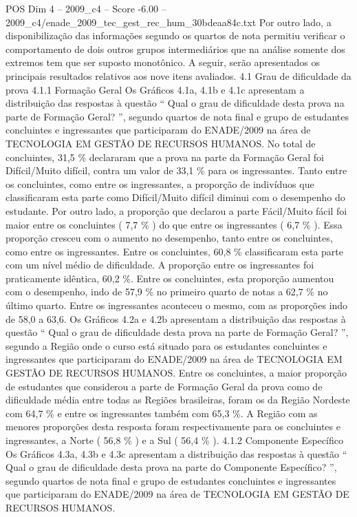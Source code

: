 \begin{textsample}{POS Dim 4 – 2009\_c4 – Score -6.00 – 2009\_c4/enade\_2009\_tec\_gest\_rec\_hum\_30bdeaa84c.txt}
Por outro lado, a disponibilização das informações segundo os quartos de nota permitiu verificar o comportamento de dois outros grupos intermediários que na análise somente dos extremos tem que ser suposto monotônico.
A seguir, serão apresentados os principais resultados relativos aos nove itens avaliados. 4.1 Grau de dificuldade da prova 4.1.1 Formação Geral Os Gráficos 4.1a, 4.1b e 4.1c apresentam a distribuição das respostas à questão “ Qual o grau de dificuldade desta prova na parte de Formação Geral? ”, segundo quartos de nota final e grupo de estudantes concluintes e ingressantes que participaram do ENADE/2009 na área de TECNOLOGIA EM GESTÃO DE RECURSOS HUMANOS.
No total de concluintes, 31,5 \% declararam que a prova na parte da Formação Geral foi Difícil/Muito difícil, contra um valor de 33,1 \% para os ingressantes.
Tanto entre os concluintes, como entre os ingressantes, a proporção de indivíduos que classificaram esta parte como Difícil/Muito difícil diminui com o desempenho do estudante.
Por outro lado, a proporção que declarou a parte Fácil/Muito fácil foi maior entre os concluintes ( 7,7 \% ) do que entre os ingressantes ( 6,7 \% ).
Essa proporção cresceu com o aumento no desempenho, tanto entre os concluintes, como entre os ingressantes.
Entre os concluintes, 60,8 \% classificaram esta parte com um nível médio de dificuldade.
A proporção entre os ingressantes foi praticamente idêntica, 60,2 \%.
Entre os concluintes, esta proporção aumentou com o desempenho, indo de 57,9 \% no primeiro quarto de notas a 62,7 \% no último quarto.
Entre os ingressantes aconteceu o mesmo, com as proporções indo de 58,0 a 63,6.
Os Gráficos 4.2a e 4.2b apresentam a distribuição das respostas à questão “ Qual o grau de dificuldade desta prova na parte de Formação Geral? ”, segundo a Região onde o curso está situado para os estudantes concluintes e ingressantes que participaram do ENADE/2009 na área de TECNOLOGIA EM GESTÃO DE RECURSOS HUMANOS.
Entre os concluintes, a maior proporção de estudantes que considerou a parte de Formação Geral da prova como de dificuldade média entre todas as Regiões brasileiras, foram os da Região Nordeste com 64,7 \% e entre os ingressantes também com 65,3 \%.
A Região com as menores proporções desta resposta foram respectivamente para os concluintes e ingressantes, a Norte ( 56,8 \% ) e a Sul ( 56,4 \% ). 4.1.2 Componente Específico Os Gráficos 4.3a, 4.3b e 4.3c apresentam a distribuição das respostas à questão “ Qual o grau de dificuldade desta prova na parte do Componente Específico? ”, segundo quartos de nota final e grupo de estudantes concluintes e ingressantes que participaram do ENADE/2009 na área de TECNOLOGIA EM GESTÃO DE RECURSOS HUMANOS.

\end{textsample}
